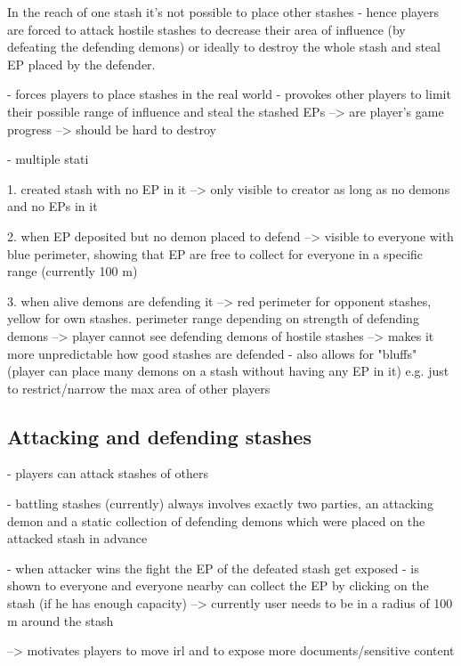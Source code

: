 In the reach of one stash it's not possible to place other stashes - hence players are forced to attack hostile stashes to decrease their area of influence (by defeating the defending demons) or ideally to destroy the whole stash and steal EP placed by the defender.

- forces players to place stashes in the real world 
- provokes other players to limit their possible range of influence and steal the stashed EPs
--> are player's game progress
--> should be hard to destroy

- multiple stati

1. created stash with no EP in it --> only visible to creator as long as no demons and no EPs in it

2. when EP deposited but no demon placed to defend --> visible to everyone with blue perimeter, showing that EP are free to collect for everyone in a specific range (currently 100 m)

3. when alive demons are defending it --> red perimeter for opponent stashes, yellow for own stashes. perimeter range depending on strength of defending demons
--> player cannot see defending demons of hostile stashes --> makes it more unpredictable how good stashes are defended
- also allows for "bluffs" (player can place many demons on a stash without having any EP in it) e.g. just to restrict/narrow the max area of other players


\subsection{Attacking and defending stashes}
\label{subsec:attackingstashes}

- players can attack stashes of others

- battling stashes (currently) always involves exactly two parties, an attacking demon and a static collection of defending demons which were placed on the attacked stash in advance

- when attacker wins the fight the EP of the defeated stash get exposed 
- is shown to everyone and everyone nearby can collect the EP by clicking on the stash (if he has enough capacity) --> currently user needs to be in a radius of 100 m around the stash 

--> motivates players to move irl and to expose more documents/sensitive content

